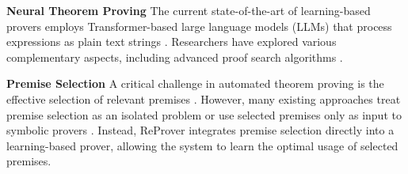 \documentclass{article} %
\begin{document}


\textbf{Neural Theorem Proving} The current state-of-the-art of learning-based provers employs Transformer-based \citep{vaswaniAttentionAllYou2017a} large language models (LLMs) that process expressions as plain text strings \citep{poluGenerativeLanguageModeling2020}. Researchers have explored various complementary aspects, including advanced proof search algorithms \citep{lampleHyperTreeProofSearch, wangDTSolverAutomatedTheorem2023}.

\textbf{Premise Selection} 
A critical challenge in automated theorem proving is the effective selection of relevant premises \citep{urbanMPTPMotivationImplementation2004, irvingDeepMathDeepSequence2016, szegedyRetrievalAugmentedProofStep, tworkowskiFormalPremiseSelection}. However, many existing approaches treat premise selection as an isolated problem \citep{irvingDeepMathDeepSequence2016, wangLearningProveTheorems2020, piotrowskiMachineLearnedPremiseSelection2023} or use selected premises only as input to symbolic provers \citep{bohmeSledgehammerJudgementDay2010, alamaPremiseSelectionMathematics2014, mikulaMagnushammerTransformerBasedApproach2024}. Instead, ReProver integrates premise selection directly into a learning-based prover, allowing the system to learn the optimal usage of selected premises.



\end{document}

